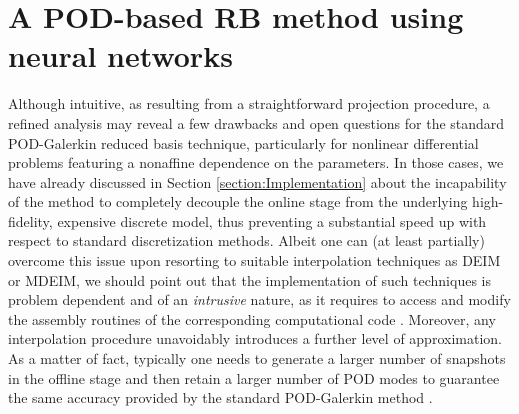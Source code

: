 \documentclass[12pt, a4paper, twoside, openright, notitlepage]{report}
\numberwithin{equation}{chapter}
\theoremstyle{theorem}
\theoremstyle{definition}
\theoremstyle{remark}
\theoremstyle{proposition}
\numberwithin{figure}{chapter}
\begin{document}
	\vspace*{0.3cm}	
		
	\section{A POD-based RB method using neural networks}
	\label{section:A POD-based RB method using neural networks}
							
		Although intuitive, as resulting from a straightforward projection procedure, a refined analysis may reveal a few drawbacks and open questions for the standard POD-Galerkin reduced basis technique, particularly for nonlinear differential problems featuring a nonaffine dependence on the parameters. In those cases, we have already discussed in Section \ref{section:Implementation} about the incapability of the method to completely decouple the online stage from the underlying high-fidelity, expensive discrete model, thus preventing a substantial speed up with respect to standard discretization methods. Albeit one can (at least partially) overcome this issue upon resorting to suitable interpolation techniques as DEIM or MDEIM, we should point out that the implementation of such techniques is problem dependent and of an \emph{intrusive} nature, as it requires to access and modify the assembly routines of the corresponding computational code \cite{Cas15}. Moreover, any interpolation procedure unavoidably introduces a further level of approximation. As a matter of fact, typically one needs to generate a larger number of snapshots in the offline stage and then retain a larger number of POD modes to guarantee the same accuracy provided by the standard POD-Galerkin method \cite{Bar04}.
		
\end{document}
